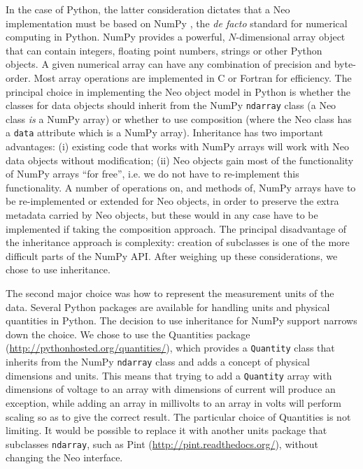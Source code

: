 \documentclass{frontiers}
\newcommand{\latin}[1]{\textit{#1}}
\begin{document}
In the case of Python, the latter consideration dictates that a Neo implementation must be based on NumPy \citep{Oliphant2007}, the \latin{de facto} standard for numerical computing in Python.
NumPy provides a powerful, $N$-dimensional array object that can contain integers, floating point numbers, strings or other Python objects.
A given numerical array can have any combination of precision and byte-order.
Most array operations are implemented in C or Fortran for efficiency.
The principal choice in implementing the Neo object model in Python is whether the classes for data objects should inherit from the NumPy \lstinline`ndarray` class (a Neo class \emph{is} a NumPy array) or whether to use composition (where the Neo class has a \lstinline`data` attribute which is a NumPy array).
Inheritance has two important advantages:
(i) existing code that works with NumPy arrays will work with Neo data objects without modification;
(ii) Neo objects gain most of the functionality of NumPy arrays ``for free'', i.e. we do not have to re-implement this functionality. 
A number of operations on, and methods of, NumPy arrays have to be re-implemented or extended for Neo objects, in order to preserve the extra metadata carried by Neo objects, but these would in any case have to be implemented if taking the composition approach.
The principal disadvantage of the inheritance approach is complexity: creation of subclasses is one of the more difficult parts of the NumPy API. After weighing up these considerations, we chose to use inheritance.

The second major choice was how to represent the measurement units of the data.
Several Python packages are available for handling units and physical quantities in Python.
The decision to use inheritance for NumPy support narrows down the choice.
We chose to use the Quantities package (\url{http://pythonhosted.org/quantities/}), which provides a \lstinline`Quantity` class that inherits from the NumPy \lstinline`ndarray` class and adds a concept of physical dimensions and units.
This means that trying to add a \lstinline`Quantity` array with dimensions of voltage to an array with dimensions of current will produce an exception, while adding an array in millivolts to an array in volts will perform scaling so as to give the correct result.
The particular choice of Quantities is not limiting.
It would be possible to replace it with another units package that subclasses \lstinline`ndarray`, such as Pint (\url{http://pint.readthedocs.org/}), without changing the Neo interface.
\end{document}

